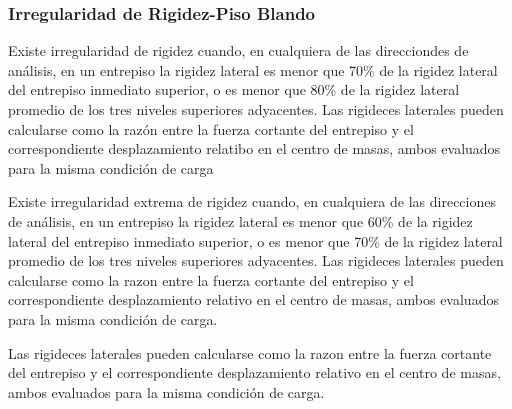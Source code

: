 \documentclass{article}%
\begin{document}
%
\subsubsection{Irregularidad de Rigidez{-}Piso Blando}%
\label{ssubsec:IrregularidaddeRigidez{-}PisoBlando}%
\begin{tcolorbox}[colback=gray!5!white,colframe=cyan!75!black,fonttitle=\bfseries,title=Tabla N°9 E-030]%
Existe irregularidad de rigidez cuando, en cualquiera de las direcciondes de análisis, en un entrepiso la rigidez lateral es menor que 70\% de la rigidez lateral del entrepiso inmediato superior, o es menor que 80\% de la rigidez lateral promedio de los tres niveles superiores adyacentes. 
 Las rigideces laterales pueden calcularse como la razón entre la fuerza cortante del entrepiso y el correspondiente desplazamiento relatibo en el centro de masas, ambos evaluados para la misma condición de carga %
\end{tcolorbox}%
\begin{tcolorbox}[colback=gray!5!white,colframe=cyan!75!black,fonttitle=\bfseries,title=Tabla N°9 E-030]%

Existe irregularidad extrema de rigidez cuando, en cualquiera de las direcciones de análisis, en un entrepiso la rigidez lateral es menor que 60\% de la rigidez lateral del entrepiso inmediato superior, o es menor que 70\% de la rigidez lateral promedio de los tres niveles superiores adyacentes.
Las rigideces laterales pueden calcularse como la razon entre la fuerza cortante del entrepiso y el correspondiente desplazamiento relativo en el centro de masas, ambos evaluados para la misma condición de carga.%
\end{tcolorbox}%
Las rigideces laterales pueden calcularse como la razon entre la fuerza cortante del entrepiso y el correspondiente desplazamiento relativo en el centro de masas, ambos evaluados para la misma condición de carga. \newline%
%
\end{document}

